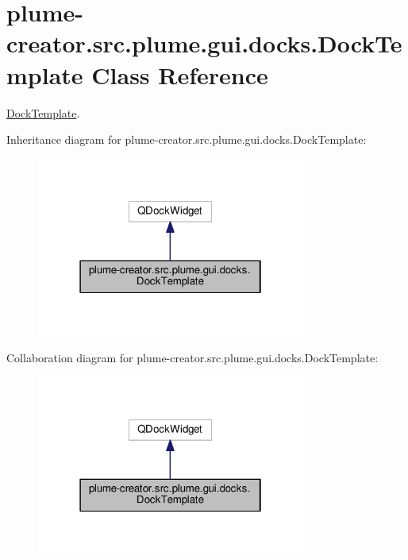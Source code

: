 \hypertarget{classplume-creator_1_1src_1_1plume_1_1gui_1_1docks_1_1_dock_template}{}\section{plume-\/creator.src.\+plume.\+gui.\+docks.\+Dock\+Template Class Reference}
\label{classplume-creator_1_1src_1_1plume_1_1gui_1_1docks_1_1_dock_template}


\hyperlink{classplume-creator_1_1src_1_1plume_1_1gui_1_1docks_1_1_dock_template}{Dock\+Template}.  




Inheritance diagram for plume-\/creator.src.\+plume.\+gui.\+docks.\+Dock\+Template\+:\nopagebreak
\begin{figure}[H]
\begin{center}
\leavevmode
\includegraphics[width=250pt]{classplume-creator_1_1src_1_1plume_1_1gui_1_1docks_1_1_dock_template__inherit__graph}
\end{center}
\end{figure}


Collaboration diagram for plume-\/creator.src.\+plume.\+gui.\+docks.\+Dock\+Template\+:\nopagebreak
\begin{figure}[H]
\begin{center}
\leavevmode
\includegraphics[width=250pt]{classplume-creator_1_1src_1_1plume_1_1gui_1_1docks_1_1_dock_template__coll__graph}
\end{center}
\end{figure}
